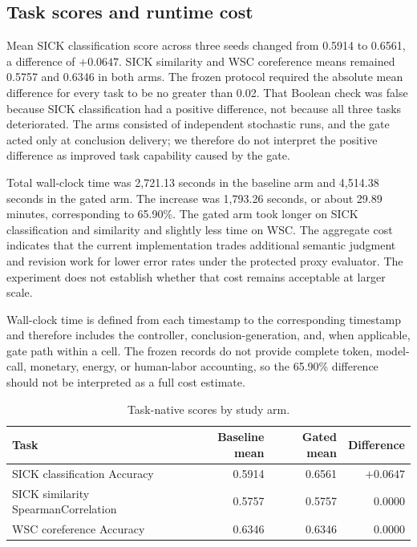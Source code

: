 \documentclass[11pt]{article}
\begin{document}
\subsection{Task scores and runtime cost}

Mean SICK classification score across three seeds changed from 0.5914 to 0.6561, a difference of $+0.0647$. SICK similarity and WSC coreference means remained 0.5757 and 0.6346 in both arms. The frozen protocol required the absolute mean difference for every task to be no greater than 0.02. That Boolean check was false because SICK classification had a positive difference, not because all three tasks deteriorated. The arms consisted of independent stochastic runs, and the gate acted only at conclusion delivery; we therefore do not interpret the positive difference as improved task capability caused by the gate.

Total wall-clock time was 2,721.13 seconds in the baseline arm and 4,514.38 seconds in the gated arm. The increase was 1,793.26 seconds, or about 29.89 minutes, corresponding to 65.90\%. The gated arm took longer on SICK classification and similarity and slightly less time on WSC. The aggregate cost indicates that the current implementation trades additional semantic judgment and revision work for lower error rates under the protected proxy evaluator. The experiment does not establish whether that cost remains acceptable at larger scale.

Wall-clock time is defined from each  timestamp to the corresponding  timestamp and therefore includes the controller, conclusion-generation, and, when applicable, gate path within a cell. The frozen records do not provide complete token, model-call, monetary, energy, or human-labor accounting, so the 65.90\% difference should not be interpreted as a full cost estimate.

\begin{table}[H]
\centering
\caption{Task-native scores by study arm.}
\label{tab:scores}
\begin{tabularx}{\textwidth}{>{\raggedright\arraybackslash}X r r r}
\toprule
Task & Baseline mean & Gated mean & Difference \\
\midrule
SICK classification Accuracy & 0.5914 & 0.6561 & $+0.0647$ \\
SICK similarity SpearmanCorrelation & 0.5757 & 0.5757 & 0.0000 \\
WSC coreference Accuracy & 0.6346 & 0.6346 & 0.0000 \\
\bottomrule
\end{tabularx}
\end{table}
\end{document}
